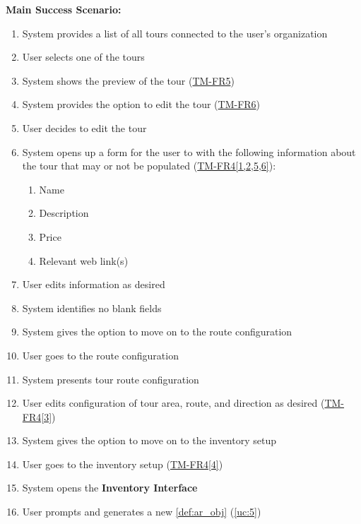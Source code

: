 \documentclass{article}
\begin{document}
\begin{enumerate}[label=\textbf{UC\arabic*}]
          \textbf{Main Success Scenario:}
          \begin{enumerate}[label=\textbf{\arabic*.}]
              \item System provides a list of all tours connected to the user’s organization
              \item User selects one of the tours
              \item System shows the preview of the tour (\hyperref[ssub:tour_management]{TM-FR5})
              \item System provides the option to edit the tour (\hyperref[ssub:tour_management]{TM-FR6})
              \item User decides to edit the tour
              \item System opens up a form for the user to with the following information about the tour that may or not be populated (\hyperref[ssub:tour_management]{TM-FR4[1,2,5,6]}):
                    \begin{enumerate}
                        \item Name
                        \item Description
                        \item Price
                        \item Relevant web link(s)
                    \end{enumerate}
              \item User edits information as desired
              \item System identifies no blank fields
              \item System gives the option to move on to the route configuration
              \item User goes to the route configuration
              \item System presents tour route configuration
              \item User edits configuration of tour area, route, and direction as desired (\hyperref[ssub:tour_management]{TM-FR4[3]})
              \item System gives the option to move on to the inventory setup
              \item User goes to the inventory setup (\hyperref[ssub:tour_management]{TM-FR4[4]})
              \item System opens the \textbf{Inventory Interface}
              \item User prompts and generates a new \ref{def:ar_obj} (\ref{uc:5})

\end{enumerate}
\end{enumerate}
\end{document}
